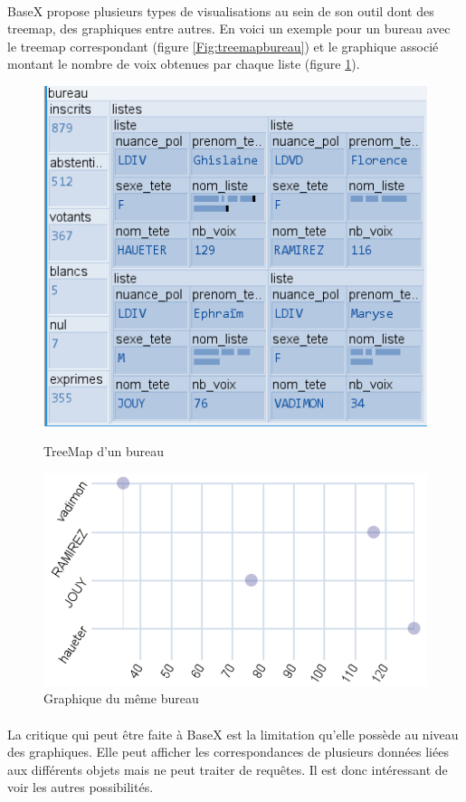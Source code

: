 \paragraph{}BaseX propose plusieurs types de visualisations au sein de son outil dont des treemap, des graphiques entre autres. En voici un exemple pour un bureau avec le treemap correspondant (figure \ref{Fig:treemapbureau}) et le graphique associé montant le nombre de voix obtenues par chaque liste (figure \ref{Fig:graphebureau}).
\begin{figure}[!htb]
   \begin{minipage}{0.48\textwidth}
     \centering
     \includegraphics[width=.6\linewidth]{./src_img/contenubureau.png}
     \caption{TreeMap d'un bureau}\label{Fig:treemapbureau}
   \end{minipage}\hfill
   \begin{minipage}{0.48\textwidth}
     \centering
     \includegraphics[width=.7\linewidth]{./src_img/graphbureau.png}
     \caption{Graphique du même bureau}\label{Fig:graphebureau}
   \end{minipage}
\end{figure}
\paragraph{}La critique qui peut être faite à BaseX est la limitation qu'elle possède au niveau des graphiques. Elle peut afficher les correspondances de plusieurs données liées aux différents objets mais ne peut traiter de requêtes. Il est donc intéressant de voir les autres possibilités.

